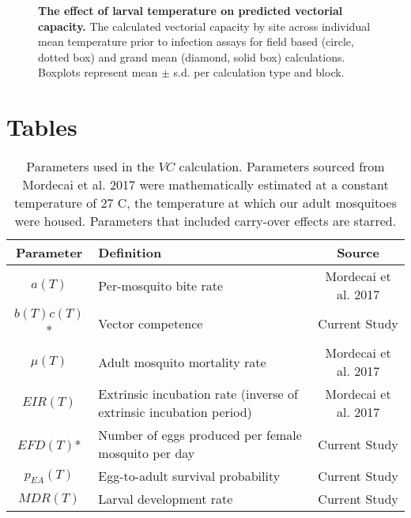 \documentclass[12pt]{article}
\begin{document}
\begin{figure}[h!]
  \caption{\textbf{The effect of larval temperature on predicted vectorial capacity.}
      The calculated vectorial capacity by site across individual mean temperature prior to infection assays for field based (circle, dotted box) and grand mean (diamond, solid box) calculations. Boxplots represent mean $\pm$ s.d. per calculation type and block.}
   \label{Fig:VC}
\end{figure}

\newpage

\section*{Tables}

\begin{table}[h!]
\caption{Parameters used in the $VC$ calculation. Parameters sourced from Mordecai et al. 2017 \cite{mordecai2017} were mathematically estimated at a constant temperature of 27 \degree C, the temperature at which our adult mosquitoes were housed. Parameters that included carry-over effects are starred.}
      \begin{tabular}{clc}
        \hline
        \textbf{Parameter} 	& \textbf{Definition} 													& \textbf{Source}\\ \hline
        $a(T)$ 				& Per-mosquito bite rate 												& Mordecai et al. 2017 \\
		$b(T)c(T)$* 		& Vector competence 													& Current Study \\
		$\mu(T)$ 			& Adult mosquito mortality rate 										& Mordecai et al. 2017 \\
		$EIR(T)$ 			& Extrinsic incubation rate (inverse of extrinsic incubation period) 	& Mordecai et al. 2017 \\
		$EFD(T)$* 			& Number of eggs produced per female mosquito per day 					& Current Study \\
		$p_{EA}(T)$ 		& Egg-to-adult survival probability 									& Current Study \\
		$MDR(T)$ 			& Larval development rate 									& Current Study \\ \hline
      \end{tabular}
      \label{table:traits}
\end{table}
\end{document}
